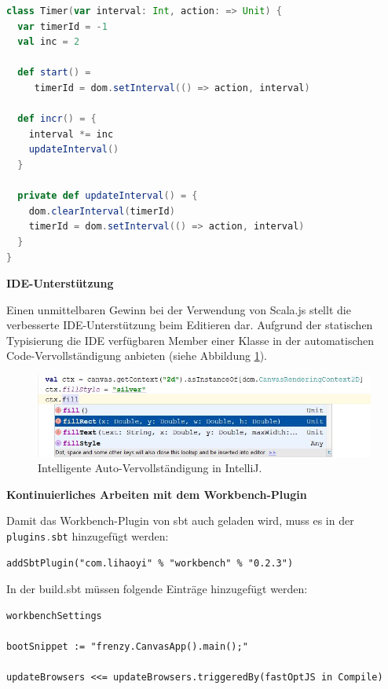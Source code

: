 \documentclass[a4paper, 12pt, hidelinks, listof=totoc, listoftables=totoc, bibliography=totoc]{scrreprt}
\newcommand{\code}[1]{\lstinline[language=Scala, style=inline]|#1|}
\newcommand{\MyMiniSec}[1]{\rmfamily\fontsize{12}{15}\selectfont
	\vspace{7pt}\textbf{#1} %
}
\begin{document}
\begin{lstlisting}[language=Scala, caption={Die Timer-Klasse des Canvas-Beispiels.}, label={code:canvas-timer}]
class Timer(var interval: Int, action: => Unit) {
  var timerId = -1
  val inc = 2

  def start() =
     timerId = dom.setInterval(() => action, interval)
   
  def incr() = {
    interval *= inc
    updateInterval()
  }

  private def updateInterval() = {
    dom.clearInterval(timerId)
    timerId = dom.setInterval(() => action, interval)
  }
}
\end{lstlisting}


\MyMiniSec{IDE-Unterstützung}

Einen unmittelbaren Gewinn bei der Verwendung von Scala.js stellt die verbesserte \ac{IDE}-Unterstützung beim Editieren dar. 
Aufgrund der statischen Typisierung die \ac{IDE} verfügbaren Member einer Klasse in der automatischen Code-Vervollständigung anbieten (siehe Abbildung \ref{fig:typesafe-autocomplete}).

\begin{figure}[!h]
    \centering
    \includegraphics[width=1.0\textwidth]{typesafe-autocomplete}
    \caption{Intelligente Auto-Vervollständigung in IntelliJ.}
    \label{fig:typesafe-autocomplete}
\end{figure}


\MyMiniSec{Kontinuierliches Arbeiten mit dem Workbench-Plugin}

Damit das Workbench-Plugin von sbt auch geladen wird, muss es in der \code{plugins.sbt} hinzugefügt werden:

\begin{lstlisting}[style=snippet]
addSbtPlugin("com.lihaoyi" % "workbench" % "0.2.3")
\end{lstlisting}

In der build.sbt müssen folgende Einträge hinzugefügt werden:
\begin{lstlisting}[style=snippet]
workbenchSettings

bootSnippet := "frenzy.CanvasApp().main();"

updateBrowsers <<= updateBrowsers.triggeredBy(fastOptJS in Compile)
\end{lstlisting}
\end{document}
